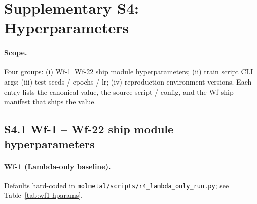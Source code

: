 %

\section*{Supplementary S4: Hyperparameters}

\providecommand{\MEASURED}{\textbf{MEASURED}}
\providecommand{\PROJECTED}{\textbf{PROJECTED}}
\providecommand{\DESIGN}{\textbf{DESIGN}}

\paragraph{Scope.}
Four groups: (i) Wf-1~Wf-22 ship module hyperparameters;
(ii) train script CLI args; (iii) test seeds / epochs / lr;
(iv) reproduction-environment versions.  Each entry lists the
canonical value, the source script / config, and the Wf ship
manifest that ships the value.

\subsection*{S4.1 Wf-1 -- Wf-22 ship module hyperparameters}
\label{supp:s4-ship}

\paragraph{Wf-1 (Lambda-only baseline).}
Defaults hard-coded in
\texttt{molmetal/scripts/r4\_lambda\_only\_run.py}; see
Table~\ref{tab:wf1-hparams}.

